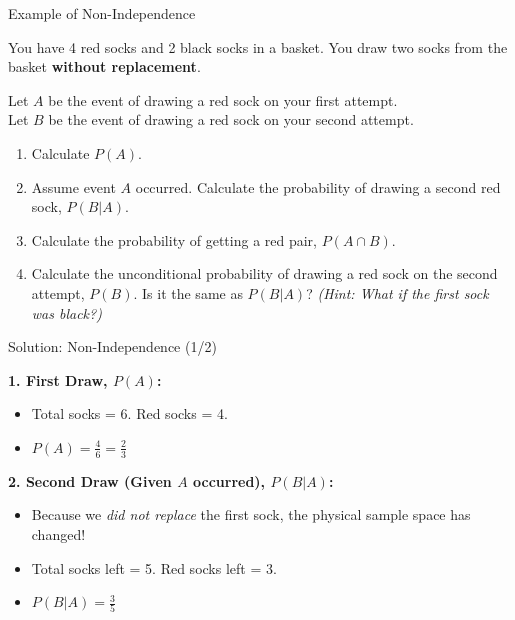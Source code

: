 \begin{frame}{Example of Non-Independence}
    \begin{example}
        You have 4 red socks and 2 black socks in a basket. You draw two socks from the basket \textbf{without replacement}. 
        
        Let $A$ be the event of drawing a red sock on your first attempt. \\
        Let $B$ be the event of drawing a red sock on your second attempt.  

        \vspace{0.3cm}
        \begin{enumerate}
            \item Calculate $P(A)$.
            \item Assume event $A$ occurred. Calculate the probability of drawing a second red sock, $P(B|A)$.
            \item Calculate the probability of getting a red pair, $P(A \cap B)$. 
            \item Calculate the unconditional probability of drawing a red sock on the second attempt, $P(B)$. Is it the same as $P(B|A)$? \textit{(Hint: What if the first sock was black?)}
        \end{enumerate}
    \end{example}  
\end{frame}

\begin{frame}{Solution: Non-Independence (1/2)}
    \begin{solution}
        \textbf{1. First Draw, $P(A)$:}
        \begin{itemize}
            \item Total socks = 6. Red socks = 4.
            \item $P(A) = \frac{4}{6} = \frac{2}{3}$
        \end{itemize}

        \pause \vspace{0.5cm}

        \textbf{2. Second Draw (Given $A$ occurred), $P(B|A)$:}
        \begin{itemize}
            \item Because we \textit{did not replace} the first sock, the physical sample space has changed!
            \item Total socks left = 5. Red socks left = 3.
            \item $P(B|A) = \frac{3}{5}$
        \end{itemize}
    \end{solution}
\end{frame}

